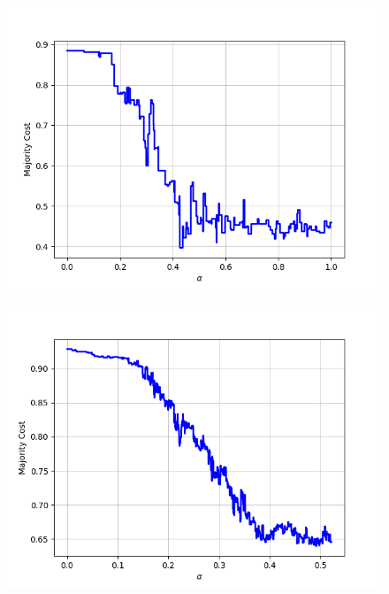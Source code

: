 \begin{figure}[H]
\begin{minipage}{.24\textwidth}
  {\includegraphics[width=\linewidth]{plots/omniglot-intra-sc-cnn/Hebrew}}
\end{minipage}
\begin{minipage}{.24\textwidth}
  \centering
  {\includegraphics[width=\linewidth]{plots/omniglot-intra-sc-cnn/Inuktitut_(Canadian_Aboriginal_Syllabics)}}
\end{minipage}
\begin{minipage}{.24\textwidth}
  \centering

\end{minipage}
\end{figure}
